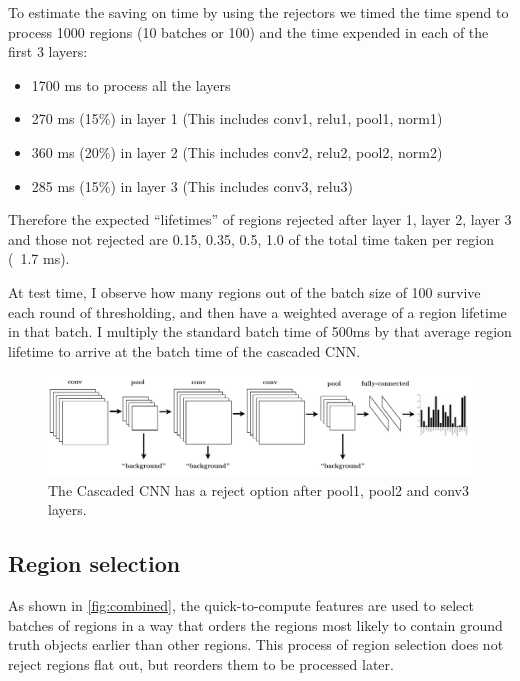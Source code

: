To estimate the saving on time by using the rejectors we timed the time spend to process 1000 regions (10 batches or 100) and the time expended in each of the first 3 layers:
\begin{itemize}
\item 1700 ms to process all the layers
\item 270 ms (15\%) in layer 1 (This includes conv1, relu1, pool1, norm1)
\item 360 ms (20\%) in layer 2 (This includes conv2, relu2, pool2, norm2)
\item 285 ms (15\%) in layer 3 (This includes conv3, relu3)
\end{itemize}

Therefore the expected ``lifetimes'' of regions rejected after layer 1, layer 2, layer 3 and those not rejected are  0.15, 0.35, 0.5, 1.0 of the total time taken per region (~1.7 ms).

At test time, I observe how many regions out of the batch size of 100 survive each round of thresholding, and then have a weighted average of a region lifetime in that batch. I multiply the standard batch time of 500ms by that average region lifetime to arrive at the batch time of the cascaded CNN.

\begin{figure}[h!]
\begin{center}
\includegraphics[width=0.98\columnwidth]{figures/ccnn.pdf}
\caption{
The Cascaded CNN has a reject option after pool1, pool2 and conv3 layers.
}\label{fig:ccnn}
\end{center}
\end{figure}

\subsection{Region selection}\label{sec:dynamic}

As shown in \autoref{fig:combined}, the quick-to-compute features are used to select batches of regions in a way that orders the regions most likely to contain ground truth objects earlier than other regions.
This process of region selection does not reject regions flat out, but reorders them to be processed later.

